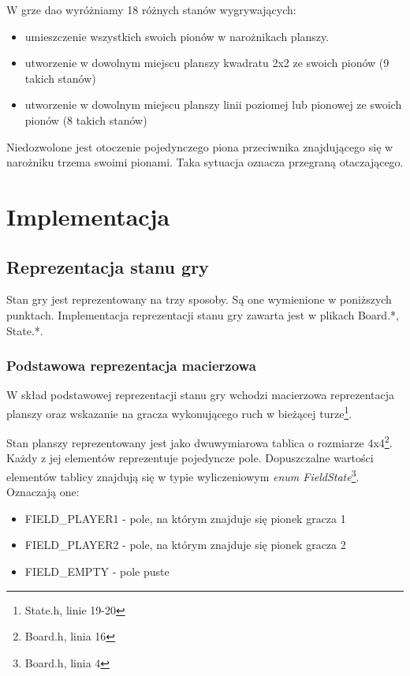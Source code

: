 \documentclass{scrartcl}
\begin{document}
W grze dao wyróżniamy 18 różnych stanów wygrywających:
\begin{itemize}
\item umieszczenie wszystkich swoich pionów w narożnikach planszy.
\item utworzenie w dowolnym miejscu planszy kwadratu 2x2 ze swoich
  pionów (9 takich stanów)
\item utworzenie w dowolnym miejscu planszy linii poziomej lub
  pionowej ze swoich pionów (8 takich stanów)
\end{itemize}

Niedozwolone jest otoczenie pojedynczego piona przeciwnika znajdującego
się w narożniku trzema swoimi pionami. Taka sytuacja oznacza
przegraną otaczającego.

\section{Implementacja}

\subsection{Reprezentacja stanu gry}

Stan gry jest reprezentowany na trzy sposoby. Są one wymienione w
poniższych punktach. Implementacja reprezentacji stanu gry zawarta 
jest w plikach Board.*, State.*.

\subsubsection{Podstawowa reprezentacja macierzowa}

W skład podstawowej reprezentacji stanu gry wchodzi 
macierzowa reprezentacja planszy oraz
wskazanie na gracza wykonującego ruch w bieżącej turze\footnote{
State.h, linie 19-20}. 

Stan planszy reprezentowany jest jako dwuwymiarowa tablica o rozmiarze
4x4\footnote{Board.h, linia 16}. Każdy z jej elementów reprezentuje
pojedyncze pole. Dopuszczalne
wartości elementów tablicy znajdują się w typie wyliczeniowym
\emph{enum FieldState}\footnote{Board.h, linia 4}. Oznaczają one:
\begin{itemize}
\item FIELD\_PLAYER1 - pole, na którym znajduje się pionek gracza 1
\item FIELD\_PLAYER2 - pole, na którym znajduje się pionek gracza 2
\item FIELD\_EMPTY - pole puste
\end{itemize}
\end{document}
